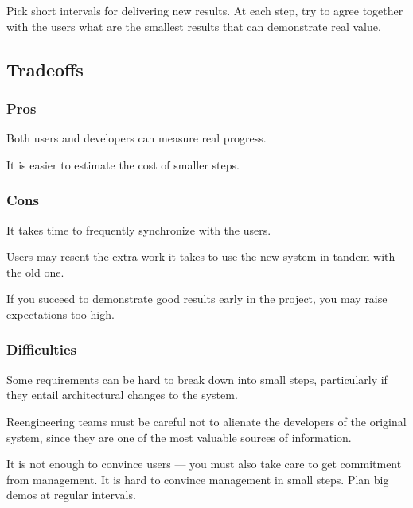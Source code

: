\documentclass[a4paper,10pt,twoside]{book}
\begin{document}
Pick short intervals for delivering new results. At each step, try to agree together with the users what are the smallest results that can demonstrate real value.

\subsection*{Tradeoffs}

\subsubsection*{Pros}

\begin{bulletlist}
\item Both users and developers can measure real progress.

\item It is easier to estimate the cost of smaller steps.
\end{bulletlist}

\subsubsection*{Cons}

\begin{bulletlist}
\item It takes time to frequently synchronize with the users.

\item Users may resent the extra work it takes to use the new system in tandem with the old one.

\item If you succeed to demonstrate good results early in the project, you may raise expectations too high.
\end{bulletlist}

\subsubsection*{Difficulties}

\begin{bulletlist}
\item Some requirements can be hard to break down into small steps, particularly if they entail architectural changes to the system.

\item Reengineering teams must be careful not to alienate the developers of the original system, since they are one of the most valuable sources of information.

\item It is not enough to convince users --- you must also take care to get commitment from management. It is hard to convince management in small steps. Plan big demos at regular intervals.
\end{bulletlist}
\end{document}
